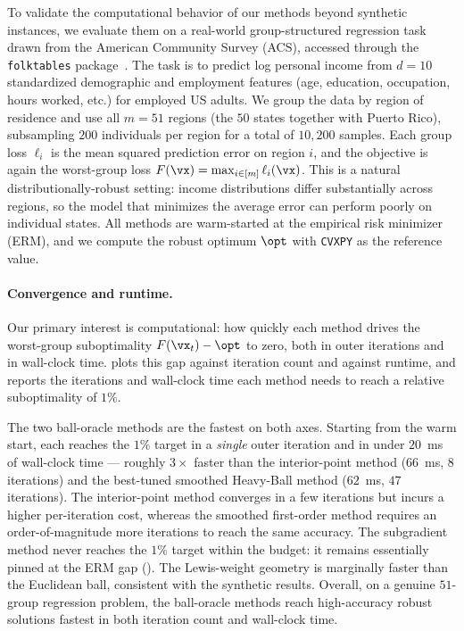 To validate the computational behavior of our methods beyond synthetic instances, we evaluate them on a real-world group-structured regression task drawn from the American Community Survey (ACS), accessed through the \texttt{folktables} package~\citep{ding2021retiring}. The task is to predict log personal income from $d=10$ standardized demographic and employment features (age, education, occupation, hours worked, etc.) for employed US adults. We group the data by region of residence and use all $m=51$ regions (the $50$ states together with Puerto Rico), subsampling $200$ individuals per region for a total of $10{,}200$ samples. Each group loss $\ell_i$ is the mean squared prediction error on region $i$, and the objective is again the worst-group loss $F(\vx) = \max_{i\in[m]} \ell_i(\vx)$. This is a natural distributionally-robust setting: income distributions differ substantially across regions, so the model that minimizes the average error can perform poorly on individual states. All methods are warm-started at the empirical risk minimizer (ERM), and we compute the robust optimum $\opt$ with \texttt{CVXPY} as the reference value.

\paragraph{Convergence and runtime.} Our primary interest is computational: how quickly each method drives the worst-group suboptimality $F(\vx_t) - \opt$ to zero, both in outer iterations and in wall-clock time.  plots this gap against iteration count and against runtime, and  reports the iterations and wall-clock time each method needs to reach a relative suboptimality of $1\%$.

The two ball-oracle methods are the fastest on both axes. Starting from the warm start, each reaches the $1\%$ target in a \emph{single} outer iteration and in under $20$~ms of wall-clock time --- roughly $3\times$ faster than the interior-point method ($66$~ms, $8$ iterations) and the best-tuned smoothed Heavy-Ball method ($62$~ms, $47$ iterations). The interior-point method converges in a few iterations but incurs a higher per-iteration cost, whereas the smoothed first-order method requires an order-of-magnitude more iterations to reach the same accuracy. The subgradient method never reaches the $1\%$ target within the budget: it remains essentially pinned at the ERM gap (). The Lewis-weight geometry is marginally faster than the Euclidean ball, consistent with the synthetic results. Overall, on a genuine $51$-group regression problem, the ball-oracle methods reach high-accuracy robust solutions fastest in both iteration count and wall-clock time.


